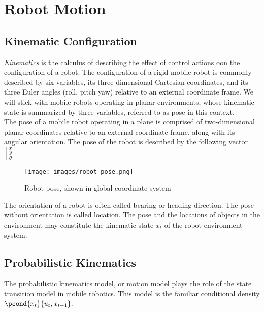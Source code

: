 \section{Robot Motion}

\subsection{Kinematic Configuration}
\textit{Kinematics} is the calculus of describing the effect of control actions oon the configuration of a robot. The configuration of a rigid mobile robot is commonly
described by six variables, its three-dimensional Cartesian coordinates, and its three Euler angles (roll, pitch yaw) relative to an external coordinate frame.
We will stick with mobile robots operating in planar environments, whose kinematic state is summarized by three variables, referred to as pose in this context.\\

The pose of a mobile robot operating in a plane is comprised of two-dimensional planar coordinates relative to an external coordinate frame, along with its angular orientation.
The pose of the robot is described by the following vector $\begin{bsmallmatrix}x \\ y \\ \theta \end{bsmallmatrix}$.
\begin{figure}[H]
  \begin{center}
    \texttt{[image: images/robot\_pose.png]}
  \end{center}
  \caption{Robot pose, shown in global coordinate system}\label{fig:Robot Pose}
\end{figure}

The orientation of a robot is often called bearing or heading direction. The pose without orientation is called location.
The pose and the locations of objects in the environment may constitute the kinematic state $x_t$ of the robot-environment system.

\subsection{Probabilistic Kinematics}
The probabilistic kinematics model, or motion model plays the role of the state transition model in mobile robotics. This model is the familiar conditional density $\pcond{x_t}{u_t, x_{t-1}}$.\\

